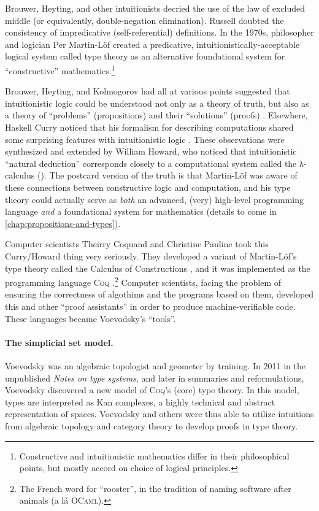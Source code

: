 \documentclass[12pt,twoside]{reedthesis}
\let\oldindex\index
\renewcommand{\index}[1]
               {\oldindex{#1}\marginpar{\footnotesize\color{index}index: #1}}
\newcommand{\indeX}{\oldindex}
\newcommand{\indeX}{\index}
\newcommand{\software}[1]{{\textsc{#1}}\indeX{#1}}
\newcommand{\Coq}{\software{Coq}}
\begin{document}
Brouwer, Heyting, and other intuitionists decried the use of the law
of excluded middle (or equivalently, double-negation elimination). Russell
doubted the consistency of impredicative (self-referential) definitions.
In the 1970s, philosopher and logician Per Martin-Löf created a predicative,
intuitionistically-acceptable logical system called type theory as an
alternative foundational system for ``constructive''
mathematics.\footnote{Constructive and intuitionistic mathematics differ in
their philosophical points, but mostly accord on choice of logical principles.}

Brouwer, Heyting, and Kolmogorov had all at various points suggested that
intuitionistic logic could be understood not only as a theory of truth, but also
as a theory of ``problems'' (propositions) and their ``solutions'' (proofs)
\cite{kolmogorov}. Elsewhere, Haskell Curry noticed that his formalism for
describing computations shared some surprising features with intuitionistic
logic \cite{curry-howard}. These observations were synthesized and extended by
William Howard, who noticed that intuitionistic ``natural deduction''
corresponds closely to a computational system called the λ-calculus (\LC{}).
The postcard version of the truth is that Martin-Löf was aware of these
connections between constructive logic and computation, and his type theory
could actually serve as \textit{both} an advanced, (very) high-level programming
language \textit{and} a foundational system for mathematics (details to come in
\cref{chap:propositions-and-types}).

Computer scientists Theirry Coquand and Christine Pauline took this Curry/Howard
thing very seriously. They developed a variant of Martin-Löf's type theory called
the Calculus of Constructions \cite{coquand}, and it was implemented as the
programming language \Coq{} \cite{coq-manual}.\footnote{The French word for
``rooster'', in the tradition of naming software after animals (a lá
\software{OCaml}).} Computer scientists, facing the problem of ensuring the
correctness of algothims and the programs based on them, developed this and
other ``proof assistants'' in order to produce machine-verifiable code. These
languages became Voevodsky's ``tools''.

\paragraph{The simplicial set model.}
Voevodsky was an algebraic topologist and
geometer by training. In 2011 in the unpublished \textit{Notes on type systems},
and later in summaries and reformulations, Voevodsky discovered a new model of
\Coq{}'s (core) type theory. In this model, types are interpreted as Kan complexes,
a highly technical and abstract representation of spaces. Voevodsky and others
were thus able to utilize intuitions from algebraic topology and category theory
to develop proofs in type theory.
\end{document}
